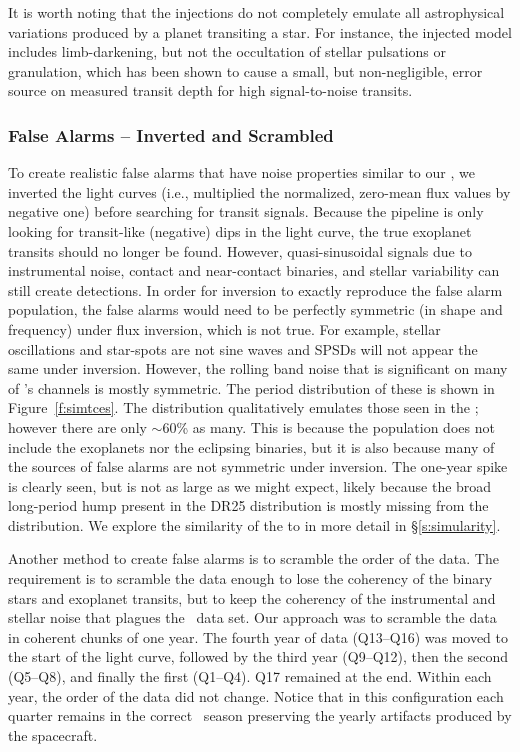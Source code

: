 It is worth noting that the injections do not completely emulate all astrophysical variations produced by a planet transiting a star.  For instance, the injected model includes limb-darkening, but not the occultation of stellar pulsations or granulation, which has been shown to cause a small, but non-negligible, error source on measured transit depth \citep{Chiavassa2017} for high signal-to-noise transits.  


\subsubsection{False Alarms -- Inverted and Scrambled} 
\label{s:tcefalsealarms}
To create realistic false alarms that have noise properties similar to our , we inverted the light curves (i.e., multiplied the normalized, zero-mean flux values by negative one) before searching for transit signals. Because the pipeline is only looking for transit-like (negative) dips in the light curve, the true exoplanet transits should no longer be found. However, quasi-sinusoidal signals due to instrumental noise, contact and near-contact binaries, and stellar variability can still create detections. In order for inversion to exactly reproduce the false alarm population, the false alarms would need to be perfectly symmetric (in shape and frequency) under flux inversion, which is not true. For example, stellar oscillations and star-spots are not sine waves and SPSDs will not appear the same under inversion. However, the rolling band noise that is significant on many of \Kepler's channels is mostly symmetric.  The period distribution of these  is shown in Figure~\ref{f:simtces}. The distribution qualitatively emulates those seen in the ; however there are only $\sim$60\% as many.  This is because the population does not include the exoplanets nor the eclipsing binaries, but it is also because many of the sources of false alarms are not symmetric under inversion.  The one-year spike is clearly seen, but is not as large as we might expect, likely because the broad long-period hump present in the DR25 \opstce{} distribution is mostly missing from the \invtce{} distribution. We explore the similarity of the  to  in more detail in \S\ref{s:simularity}.

Another method to create false alarms is to scramble the order of the data. The requirement is to scramble the data enough to lose the coherency of the binary stars and exoplanet transits, but to keep the coherency of the instrumental and stellar noise that plagues the \Kepler\ data set. Our approach was to scramble the data in coherent chunks of one year. The fourth year of data (Q13--Q16) was moved to the start of the light curve, followed by the third year (Q9--Q12), then the second (Q5--Q8), and finally the first (Q1--Q4). Q17 remained at the end. Within each year, the order of the data did not change. Notice that in this configuration each quarter remains in the correct \Kepler\ season preserving the yearly artifacts produced by the spacecraft. 

